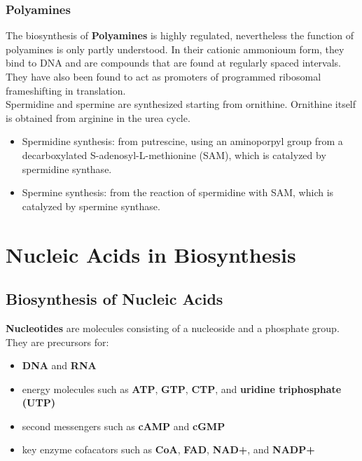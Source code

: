 \documentclass[../main.tex]{subfiles}
\begin{document}
\subsubsection{Polyamines}

The biosynthesis of \textbf{\gls{Polyamines}} is highly regulated, nevertheless the function of polyamines is only partly understood. In their cationic ammonioum form, they bind to DNA and are compounds that are found at regularly spaced intervals. They have also been found to act as promoters of programmed ribosomal frameshifting in translation. \\

Spermidine and spermine are synthesized starting from ornithine. Ornithine itself is obtained from arginine in the urea cycle. 
\begin{itemize}
	\item Spermidine synthesis: from putrescine, using an aminoporpyl group from a decarboxylated S-adenosyl-L-methionine (SAM), which is catalyzed by spermidine synthase.
	\item Spermine synthesis: from the reaction of spermidine with SAM, which is catalyzed by spermine synthase.
\end{itemize} 


\section{Nucleic Acids in Biosynthesis}

\subsection{Biosynthesis of Nucleic Acids}

\textbf{\gls{Nucleotides}} are molecules consisting of a nucleoside and a phosphate group. They are precursors for:
\begin{itemize}
	\item \textbf{\gls{DNA}} and \textbf{\gls{RNA}}
	\item energy molecules such as \textbf{\gls{ATP}}, \textbf{\gls{GTP}}, \textbf{\gls{CTP}}, and \textbf{\gls{uridine triphosphate (UTP)}} 
	\item second messengers such as \textbf{\gls{cAMP}} and \textbf{\gls{cGMP}}
	\item key enzyme cofacators such as \textbf{\gls{CoA}}, \textbf{\gls{FAD}}, \textbf{\gls{NAD+}}, and \textbf{\gls{NADP+}}
\end{itemize}
\end{document}
